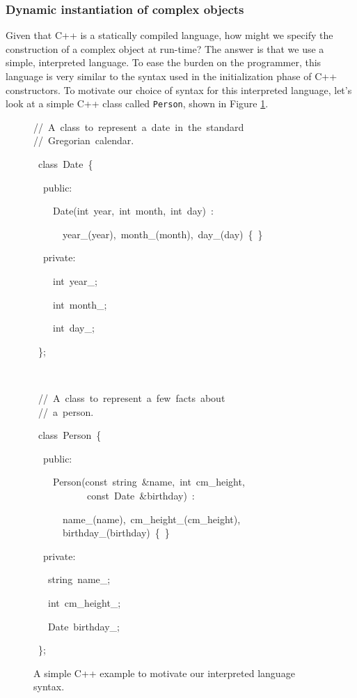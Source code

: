 \documentclass[a4paper]{article}
\newenvironment{lyxcode}
{\par\begin{list}{}{
\scriptsize
\setlength{\leftmargin}{0.1in}
\setlength{\rightmargin}{\leftmargin}
\setlength{\listparindent}{0pt}%
\raggedright
\setlength{\itemsep}{0pt}
\setlength{\parsep}{0pt}
\normalfont\ttfamily}%
 \item[]}
{\end{list}}
\begin{document}
\subsubsection{Dynamic instantiation of complex objects}

Given that C++ is a statically compiled language, how might we specify
the construction of a complex object at run-time? The answer is that
we use a simple, interpreted language. To ease the burden on the programmer,
this language is very similar to the syntax used in the initialization
phase of C++ constructors. To motivate our choice of syntax for this
interpreted language, let's look at a simple C++ class called \texttt{Person},
shown in Figure \ref{fig:cpp-person-example}. 
\begin{figure}
\begin{lyxcode}
//~A~class~to~represent~a~date~in~the~standard\\
//~Gregorian~calendar.

~class~Date~\{

~~public:

~~~~Date(int~year,~int~month,~int~day)~:

~~~~~~year\_(year),~month\_(month),~day\_(day)~\{~\}

~~private:

~~~~int~year\_;

~~~~int~month\_;

~~~~int~day\_;

~\};

\

~//~A~class~to~represent~a~few~facts~about\\
~//~a~person.

~class~Person~\{

~~public:

~~~~Person(const~string~\&name,~int~cm\_height,\\

~~~~~~~~~~~const~Date~\&birthday)~:

~~~~~~name\_(name),~cm\_height\_(cm\_height),\\

~~~~~~birthday\_(birthday)~\{~\}

~~private:

~~~string~name\_;

~~~int~cm\_height\_;

~~~Date~birthday\_;

~\};
\end{lyxcode}
\caption{\label{fig:cpp-person-example}A simple C++ example to motivate our
interpreted language syntax.}
\end{figure}
\end{document}
